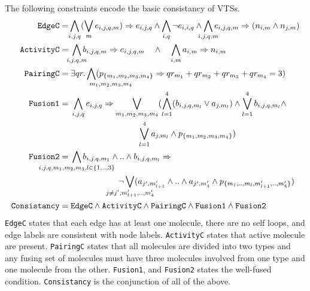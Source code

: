 The following constraints encode the basic consistancy of VTSs.
\begin{align*}
  \texttt{EdgeC} =\;&\hspace{-1ex}\bigwedge\limits_{i,j,q} (\bigvee_m e_{i,j,q,m} )\limplies e_{i,j,q}
  \land
  \bigwedge\limits_{i,q} \neg e_{i,i,q}
  \land
  \bigwedge\limits_{\mathclap{i,j,q,m}} e_{i,j,q,m} \limplies (n_{i,m} \land n_{j,m} )
  \\
  \texttt{ActivityC} =\;&
  \bigwedge\limits_{\mathclap{i,j,q,m}} b_{i,j,q,m} \limplies e_{i,j,q,m} \quad\land\quad
  \bigwedge\limits_{i,m} a_{i,m} \limplies n_{i,m}
  \\
  \texttt{PairingC} =\;&
  \exists qr. \Land\limits_{\mathrlap{m_1,m_2,m_3,m_4}\;\;}
                         (p_{\{m_1,m_2,m_3,m_4\}} \limplies qr_{m_1} + qr_{m_2} + qr_{m_3} + qr_{m_4} = 3) 
  \\
  \texttt{Fusion1} =\;&
  \bigwedge\limits_{i,j,q} e_{i,j,q} \limplies
  \bigvee_{{m_1,m_2,m_3,m_4}} (\Land_{l=1}^4 ( b_{i,j,q,m_l} \lor a_{j,m_l} ) \land 
                        \Lor\limits_{l=1}^4 b_{i,j,q,m_l} \land\\
  & \qquad \qquad \qquad \qquad \Lor\limits_{l=1}^4 a_{j,m_l}\land p_{\{m_1,m_2,m_3,m_4\}})
  \\
  \texttt{Fusion2} =\;&
\bigwedge\limits_{\mathclap{i,j,q,m_1,m_2,m_3, l \in \{1,..,3\}}} b_{i,j,q,m_1} \land ..\land b_{i,j,q,m_l} \limplies \\
  & \hspace{2cm} \neg 
  \bigvee_{\mathclap{j \neq j^{\prime}, m_{l+1}^{\prime},..,m_{4}^{\prime}}} ( a_{j^{\prime},m_{l+1}^{\prime}} \land .. \land a_{j^{\prime},m_4^{\prime}} \land p_{\{m_1,..,m_l,m^{\prime}_{l+1},..,m^{\prime}_4\}})
  \\
  \texttt{Consistancy} =\;& \texttt{EdgeC} \land
  \texttt{ActivityC} \land \texttt{PairingC} \land
  \texttt{Fusion1} \land \texttt{Fusion2} 
\end{align*}
\texttt{EdgeC} states that each edge has at least one molecule,
there are no self loops, and edge labels are consistent with node labels.   
\texttt{ActivityC} states that active molecule are present.
\texttt{PairingC} states that all molecules are divided into
two types and any fusing set of molecules
must have three molecules involved from one type and one molecule from the other.
\texttt{Fusion1}, and \texttt{Fusion2} states the well-fused condition.
\texttt{Consistancy} is the conjunction of all of the above.


